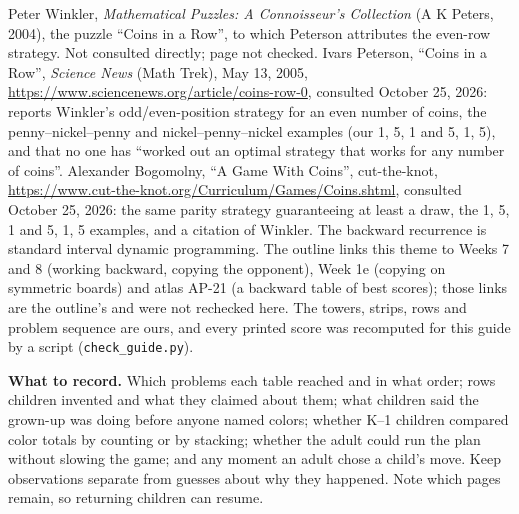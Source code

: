 Peter Winkler, \emph{Mathematical Puzzles: A Connoisseur's Collection} (A K Peters, 2004), the puzzle ``Coins in a Row'', to which Peterson attributes the even-row strategy. Not consulted directly; page not checked. Ivars Peterson, ``Coins in a Row'', \emph{Science News} (Math Trek), May 13, 2005, \url{https://www.sciencenews.org/article/coins-row-0}, consulted October 25, 2026: reports Winkler's odd/even-position strategy for an even number of coins, the penny--nickel--penny and nickel--penny--nickel examples (our 1, 5, 1 and 5, 1, 5), and that no one has ``worked out an optimal strategy that works for any number of coins''. Alexander Bogomolny, ``A Game With Coins'', cut-the-knot, \url{https://www.cut-the-knot.org/Curriculum/Games/Coins.shtml}, consulted October 25, 2026: the same parity strategy guaranteeing at least a draw, the 1, 5, 1 and 5, 1, 5 examples, and a citation of Winkler. The backward recurrence is standard interval dynamic programming. The outline links this theme to Weeks 7 and 8 (working backward, copying the opponent), Week 1e (copying on symmetric boards) and atlas AP-21 (a backward table of best scores); those links are the outline's and were not rechecked here. The towers, strips, rows and problem sequence are ours, and every printed score was recomputed for this guide by a script (\texttt{check\_guide.py}).

\textbf{What to record.} Which problems each table reached and in what order; rows children invented and what they claimed about them; what children said the grown-up was doing before anyone named colors; whether K--1 children compared color totals by counting or by stacking; whether the adult could run the plan without slowing the game; and any moment an adult chose a child's move. Keep observations separate from guesses about why they happened. Note which pages remain, so returning children can resume.

